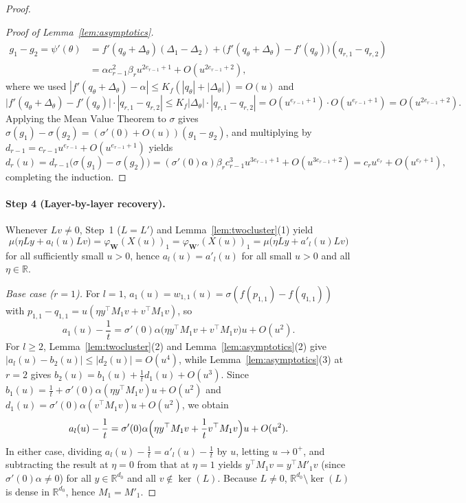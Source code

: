 \documentclass[11pt]{article}
\theoremstyle{plain}
\theoremstyle{definition}
\theoremstyle{remark}
\newcommand{\R}{\mathbb{R}}
\newcommand{\bfW}{\mathbf{W}}
\begin{document}
\begin{proof}
\begin{proof}[Proof of Lemma~\ref{lem:asymptotics}]
\begin{align*}
g_1 - g_2 = \psi'(\theta)
&= f'(q_\theta + \Delta_\theta)(\Delta_1 - \Delta_2) + \bigl(f'(q_\theta + \Delta_\theta) - f'(q_\theta)\bigr)(q_{r,1} - q_{r,2}) \\
&= \alpha c_{r-1}^2 \beta_r u^{2e_{r-1}+1} + O(u^{2e_{r-1}+2}),
\end{align*}
where we used $|f'(q_\theta + \Delta_\theta) - \alpha| \le K_f(|q_\theta| + |\Delta_\theta|) = O(u)$ and
\[
\bigl|f'(q_\theta + \Delta_\theta) - f'(q_\theta)\bigr|\cdot |q_{r,1} - q_{r,2}|
\le K_f |\Delta_\theta| \cdot |q_{r,1} - q_{r,2}|
= O(u^{e_{r-1}+1})\cdot O(u^{e_{r-1}+1}) = O(u^{2e_{r-1}+2}).
\]
Applying the Mean Value Theorem to $\sigma$ gives $\sigma(g_1) - \sigma(g_2) = (\sigma'(0) + O(u))(g_1 - g_2)$, and multiplying by $d_{r-1} = c_{r-1}u^{e_{r-1}} + O(u^{e_{r-1}+1})$ yields
\[
d_r(u) = d_{r-1}\bigl(\sigma(g_1) - \sigma(g_2)\bigr)
= (\sigma'(0)\alpha)\beta_r c_{r-1}^3 u^{3e_{r-1}+1} + O(u^{3e_{r-1}+2})
= c_r u^{e_r} + O(u^{e_r+1}),
\]
completing the induction.
\end{proof}

\paragraph{Step 4 (Layer-by-layer recovery).}
Whenever $L v \neq 0$, Step~1 ($L = L'$) and Lemma~\ref{lem:twocluster}(1) yield
\[
\mu\bigl(\eta L y + a_l(u) L v\bigr) = \varphi_{\bfW}(X(u))_1 = \varphi_{\bfW'}(X(u))_1 = \mu\bigl(\eta L y + a'_l(u) L v\bigr)
\]
for all sufficiently small $u > 0$, hence $a_l(u) = a'_l(u)$ for all small $u > 0$ and all $\eta \in \R$.

\emph{Base case ($r = 1$).}
For $l = 1$, $a_1(u) = w_{1,1}(u) = \sigma(f(p_{1,1}) - f(q_{1,1}))$ with $p_{1,1} - q_{1,1} = u(\eta y^\top M_1 v + v^\top M_1 v)$, so
\[
a_1(u) - \frac{1}{t} = \sigma'(0)\alpha\bigl(\eta y^\top M_1 v + v^\top M_1 v\bigr) u + O(u^2).
\]
For $l \ge 2$, Lemma~\ref{lem:twocluster}(2) and Lemma~\ref{lem:asymptotics}(2) give $|a_l(u) - b_2(u)| \le |d_2(u)| = O(u^4)$, while Lemma~\ref{lem:asymptotics}(3) at $r = 2$ gives $b_2(u) = b_1(u) + \frac{1}{t} d_1(u) + O(u^3)$. Since $b_1(u) = \frac{1}{t} + \sigma'(0)\alpha(\eta y^\top M_1 v) u + O(u^2)$ and $d_1(u) = \sigma'(0)\alpha(v^\top M_1 v) u + O(u^2)$, we obtain
\[
a_l(u) - \frac{1}{t} = \sigma'(0)\alpha\Bigl(\eta y^\top M_1 v + \frac{1}{t} v^\top M_1 v\Bigr) u + O(u^2).
\]
In either case, dividing $a_l(u) - \frac{1}{t} = a'_l(u) - \frac{1}{t}$ by $u$, letting $u \to 0^+$, and subtracting the result at $\eta = 0$ from that at $\eta = 1$ yields $y^\top M_1 v = y^\top M'_1 v$ (since $\sigma'(0)\alpha \neq 0$) for all $y \in \R^{d_0}$ and all $v \notin \ker(L)$. Because $L \neq 0$, $\R^{d_0} \setminus \ker(L)$ is dense in $\R^{d_0}$, hence $M_1 = M'_1$.


\end{proof}
\end{document}
